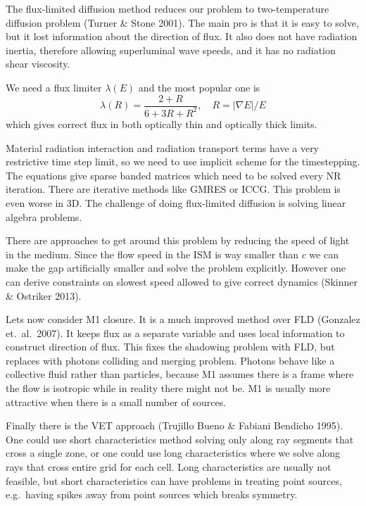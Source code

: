 \documentclass[letterpaper, 11pt]{article}
\numberwithin{equation}{section}
\numberwithin{figure}{section}
\begin{document}
The flux-limited diffusion method reduces our problem to two-temperature
diffusion problem (Turner \& Stone 2001). The main pro is that it is easy to
solve, but it lost information about the direction of flux. It also does not
have radiation inertia, therefore allowing superluminal wave speeds, and it has
no radiation shear viscosity.

We need a flux limiter $\lambda(E)$ and the most popular one is
\begin{equation}
  \label{eq:16}
  \lambda(R) = \frac{2 + R}{6 + 3R + R^2},\quad R = \left| \nabla E \right|/E
\end{equation}
which gives correct flux in both optically thin and optically thick limits.

Material radiation interaction and radiation transport terms have a very
restrictive time step limit, so we need to use implicit scheme for the
timestepping. The equations give sparse banded matrices which need to be solved
every NR iteration. There are iterative methods like GMRES or ICCG. This problem
is even worse in 3D. The challenge of doing flux-limited diffusion is solving
linear algebra problems.

There are approaches to get around this problem by reducing the speed of light
in the medium. Since the flow speed in the ISM is way smaller than $c$ we can
make the gap artificially smaller and solve the problem explicitly. However one
can derive constraints on slowest speed allowed to give correct dynamics
(Skinner \& Ostriker 2013).

Lets now consider M1 closure. It is a much improved method over FLD (Gonzalez
et.\ al.\ 2007). It keeps flux as a separate variable and uses local information
to construct direction of flux. This fixes the shadowing problem with FLD, but
replaces with photons colliding and merging problem. Photons behave like a
collective fluid rather than particles, because M1 assumes there is a frame
where the flow is isotropic while in reality there might not be. M1 is usually
more attractive when there is a small number of sources.

Finally there is the VET approach (Trujillo Bueno \& Fabiani Bendicho 1995). One
could use short characteristics method solving only along ray segments that
cross a single zone, or one could use long characteristics where we solve along
rays that cross entire grid for each cell. Long characteristics are usually not
feasible, but short characteristics can have problems in treating point sources,
e.g.\ having spikes away from point sources which breaks symmetry.
\end{document}
